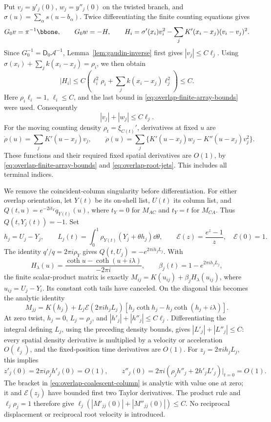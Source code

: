 Put \(v_j=y'_j(0)\), \(w_j=y''_j(0)\) on the twisted branch, and
\(\sigma(u)=\sum_\alpha s(u-b_\alpha)\).
Twice differentiating the finite counting equations gives
\[
 G_0v=\pi^{-1}\bbone,\qquad G_0w=-H,\qquad
 H_i=\sigma'(x_i)v_i^2
       -\sum_jK'(x_i-x_j)(v_i-v_j)^2.
\]
Since \(G_0^{-1}=\mathsf D_0\mathcal A^{-1}\),
Lemma~\ref{lem:gaudin-inverse} first gives \(|v_j|\le C\ell_j\).
Using \(\sigma(x_i)+\sum_j k(x_i-x_j)=\rho_i\), we then obtain
\[
 |H_i|\le C\left(\ell_i^2\rho_i+
                         \sum_j k(x_i-x_j)\ell_j^2\right)\le C.
\]
Here \(\rho_i\ell_i=1\), \(\ell_i\le C\), and the last bound in
\eqref{eq:overlap-finite-array-bounds} were used. Consequently
\begin{equation}\label{eq:overlap-root-jets}
 |v_j|+|w_j|\le C\ell_j.
\end{equation}
For the moving counting density \(\rho_t=\xi_{C(t)}'\), derivatives
at fixed \(u\) are
\[
 \dot\rho(u)=\sum_jK'(u-x_j)v_j,\qquad
 \ddot\rho(u)=\sum_j\{K'(u-x_j)w_j-K''(u-x_j)v_j^2\}.
\]
These functions and their required fixed spatial derivatives are
\(O(1)\), by \eqref{eq:overlap-finite-array-bounds} and
\eqref{eq:overlap-root-jets}. This includes all terminal indices.

We remove the coincident-column singularity before differentiation.
For either overlap orientation, let \(Y(t)\) be its on-shell list,
\(U(t)\) its column list, and
\(Q(t,u)=e^{-2it_Y}q_{Y(t)}(u)\), where \(t_Y=0\) for \(M_{AC}\)
and \(t_Y=t\) for \(M_{CA}\). Thus \(Q(t,Y_j(t))=-1\).
Set
\[
 h_j=U_j-Y_j,\qquad
 L_j(t)=\int_0^1\rho_{Y(t)}(Y_j+\theta h_j)\dd\theta,
 \qquad \mathcal E(z)=\frac{e^z-1}{z},\quad \mathcal E(0)=1.
\]
The identity \(q'/q=2\pi i\rho_Y\) gives
\(Q(t,U_j)=-e^{2\pi i h_jL_j}\). With
\[
 H_\lambda(u)=\frac{\coth u-\coth(u+i\lambda)}{-2\pi i},
 \qquad \beta_j(t)=1-e^{2\pi i h_jL_j},
\]
the finite scalar-product matrix is exactly
\(M_{ij}=K(u_{ij})+\beta_jH_\lambda(u_{ij})\),
where \(u_{ij}=U_j-Y_i\). Its constant coth tails have canceled.
On the diagonal this becomes the analytic identity
\begin{equation}\label{eq:overlap-coalescent-column}
 M_{jj}=K(h_j)+L_j\mathcal E(2\pi i h_jL_j)
       [h_j\coth h_j-h_j\coth(h_j+i\lambda)].
\end{equation}
At zero twist, \(h_j=0\), \(L_j=\rho_j\), and
\(|h'_j|+|h''_j|\le C\ell_j\).
Differentiating the integral defining \(L_j\), using the preceding
density bounds, gives \(|L'_j|+|L''_j|\le C\): every spatial
density derivative is multiplied by a velocity or acceleration
\(O(\ell_j)\), and the fixed-position time derivatives are \(O(1)\).
For \(z_j=2\pi i h_jL_j\), this implies
\[
 z'_j(0)=2\pi i\rho_jh'_j(0)=O(1),\qquad
 z''_j(0)=2\pi i(\rho_jh''_j+2h'_jL'_j)\big|_{t=0}=O(1).
\]
The bracket in \eqref{eq:overlap-coalescent-column} is analytic
with value one at zero; it and \(\mathcal E(z_j)\) have bounded first two
Taylor derivatives. The product rule and \(\ell_j\rho_j=1\) therefore
give \(\ell_j(|M'_{jj}(0)|+|M''_{jj}(0)|)\le C\).
No reciprocal displacement or reciprocal root velocity is introduced.

